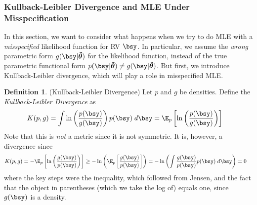 \documentclass[12pt]{article}
\theoremstyle{plain}
\theoremstyle{definition}
\newtheorem{defn}[thm]{Definition}
\theoremstyle{remark}
\newcommand{\bstildetheta}{\boldsymbol{\tilde{\theta}}}
\begin{document}



\clearpage
\subsubsection{%
  Kullback-Leibler Divergence and MLE Under Misspecification}

In this section, we want to consider what happens when we try to do MLE
with a \emph{misspecified} likelihood function for RV $\bsy$.
In particular, we assume the \emph{wrong} parametric form
$g(\bsy|\bstildetheta)$ for the likelihood function, instead of the true
parametric functional form
$p(\bsy|\bstildetheta)\neq g(\bsy|\bstildetheta)$.
But first, we introduce Kullback-Leibler divergence, which will play a
role in misspecified MLE.


\begin{defn}(Kullback-Leibler Divergence)
Let $p$ and $g$ be densities. Define the
\emph{Kullback-Leibler Divergence} as
\begin{align*}
  K(p,g)
  &= \int \ln\left(\frac{p(\bsy)}{g(\bsy)} \right) p(\bsy)\;d\bsy
  = \E_p\left[
  \ln\left(\frac{p(\bsy)}{g(\bsy)} \right)
  \right]
\end{align*}
Note that this is \emph{not} a metric since it is not symmetric. It is,
however, a divergence since
\begin{align*}
  K(p,g)
  &=
  -\E_p\left[
  \ln\left(\frac{g(\bsy)}{p(\bsy)}\right)
  \right]
  \geq
  -\ln\left(
  \E_p\left[
  \frac{g(\bsy)}{p(\bsy)}
  \right]\right)
  =
  -\ln\left(
  \int
  \frac{g(\bsy)}{p(\bsy)}
  p(\bsy)
  \;d\bsy
  \right)
  =
  0
\end{align*}
where the key steps were the inequality, which followed from Jensen, and
the fact that the object in parentheses (which we take the log of)
equals one, since $g(\bsy)$ is a density.
\end{defn}
\end{document}
